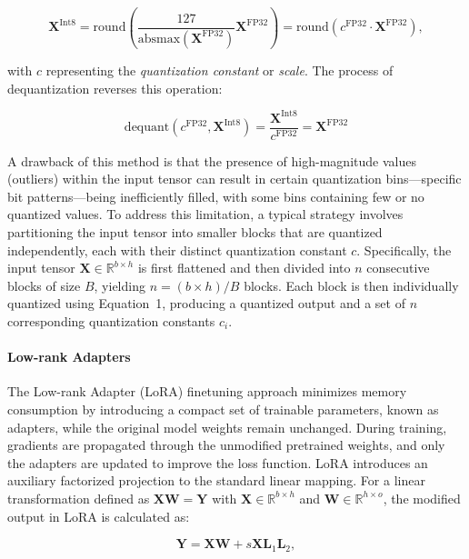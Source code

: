 \begin{equation}
    \mathbf{X}^{ \text{Int8}} = \text{round}\left( \frac{127}{{\text{absmax}}(\mathbf{X}^{{\text{FP32}}})}\mathbf{X}^{{\text{FP32}}} \right) = \text{round}(c^{\text{FP32}}\cdot \mathbf{X}^{{\text{FP32}}}),
\end{equation}

with $c$ representing the {\em quantization constant} or {\em scale}. The process of dequantization reverses this operation:

\begin{equation}
    \text{dequant}(c^{\text{FP32}}, \mathbf{X}^{\text{Int8}}) = \frac{\mathbf{X}^{\text{Int8}}}{c^{\text{FP32}}} = \mathbf{X}^{\text{FP32}}
\end{equation}

A drawback of this method is that the presence of high-magnitude values (outliers) within the input tensor can result in certain quantization bins—specific bit patterns—being inefficiently filled, with some bins containing few or no quantized values. To address this limitation, a typical strategy involves partitioning the input tensor into smaller blocks that are quantized independently, each with their distinct quantization constant $c$. Specifically, the input tensor $\mathbf{X}\in \mathbb{R}^{b\times h}$ is first flattened and then divided into $n$ consecutive blocks of size $B$, yielding $n = ({b\times h})/{B}$ blocks. Each block is then individually quantized using Equation~1, producing a quantized output and a set of $n$ corresponding quantization constants $c_i$.

\paragraph{Low-rank Adapters} The Low-rank Adapter (LoRA) finetuning approach \citep{hu2021lora} minimizes memory consumption by introducing a compact set of trainable parameters, known as adapters, while the original model weights remain unchanged. During training, gradients are propagated through the unmodified pretrained weights, and only the adapters are updated to improve the loss function. LoRA introduces an auxiliary factorized projection to the standard linear mapping. For a linear transformation defined as ${\mathbf{X} \mathbf{W} = \mathbf{Y}}$ with $\mathbf{X}\in  \mathbb{R}^{b\times h}$ and $\mathbf{W}\in  \mathbb{R}^{h\times o}$, the modified output in LoRA is calculated as:

\begin{equation}
    \mathbf{Y} = \mathbf{X}\mathbf{W} + s\mathbf{X}\mathbf{L}_1\mathbf{L}_2,
\end{equation}

